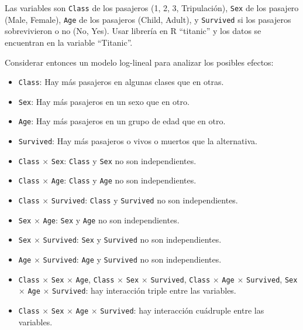Las variables son \texttt{Class} de los pasajeros (1, 2, 3, Tripulación), \texttt{Sex} de los pasajero (Male, Female), \texttt{Age} de los pasajeros (Child, Adult), y \texttt{Survived} si los pasajeros sobrevivieron o no (No, Yes). Usar librería en R ``titanic'' y los datos se encuentran en la variable ``Titanic''.

\vspace{1em} %

Considerar entonces un modelo log-lineal para analizar los posibles efectos:
\begin{itemize}
    \item \texttt{Class}: Hay más pasajeros en algunas clases que en otras.
    \item \texttt{Sex}: Hay más pasajeros en un sexo que en otro.
    \item \texttt{Age}: Hay más pasajeros en un grupo de edad que en otro.
    \item \texttt{Survived}: Hay más pasajeros o vivos o muertos que la alternativa.
    \item \texttt{Class} $\times$ \texttt{Sex}: \texttt{Class} y \texttt{Sex} no son independientes.
    \item \texttt{Class} $\times$ \texttt{Age}: \texttt{Class} y \texttt{Age} no son independientes.
    \item \texttt{Class} $\times$ \texttt{Survived}: \texttt{Class} y \texttt{Survived} no son independientes.
    \item \texttt{Sex} $\times$ \texttt{Age}: \texttt{Sex} y \texttt{Age} no son independientes.
    \item \texttt{Sex} $\times$ \texttt{Survived}: \texttt{Sex} y \texttt{Survived} no son independientes.
    \item \texttt{Age} $\times$ \texttt{Survived}: \texttt{Age} y \texttt{Survived} no son independientes.
    \item \texttt{Class} $\times$ \texttt{Sex} $\times$ \texttt{Age}, \texttt{Class} $\times$ \texttt{Sex} $\times$ \texttt{Survived}, \texttt{Class} $\times$ \texttt{Age} $\times$ \texttt{Survived}, \texttt{Sex} $\times$ \texttt{Age} $\times$ \texttt{Survived}: hay interacción triple entre las variables.
    \item \texttt{Class} $\times$ \texttt{Sex} $\times$ \texttt{Age} $\times$ \texttt{Survived}: hay interacción cuádruple entre las variables.
\end{itemize}

\noindent{}\\

